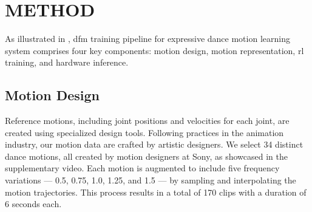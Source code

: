 \section{METHOD}
As illustrated in , \ac{dfm} training pipeline for expressive dance motion learning system comprises four key components: motion design, motion representation, \ac{rl} training, and hardware inference.

\subsection{Motion Design}
Reference motions, including joint positions and velocities for each joint, are created using specialized design tools.
Following practices in the animation industry, our motion data are crafted by artistic designers.
We select 34 distinct dance motions, all created by motion designers at Sony, as showcased in the supplementary video.
Each motion is augmented to include five frequency variations — 0.5, 0.75, 1.0, 1.25, and 1.5 — by sampling and interpolating the motion trajectories.
This process results in a total of 170 clips with a duration of 6 seconds each.

